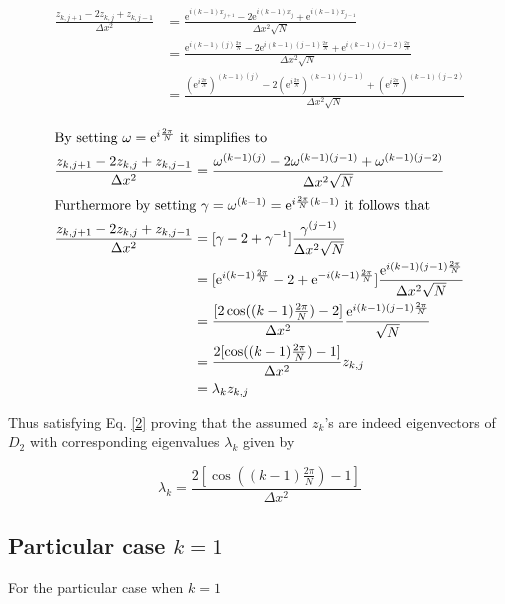\documentclass{article}
\newcommand{\E}{\mathrm{e}}
\begin{document}
\begin{equation*}
	\begin{split}
		\frac{z_{k,j+1} - 2 z_{k,j} + z_{k,j-1}}{\Delta x^2} 
		& = \frac{\E^{i (k-1) x_{j+1} } - 2 \E^{i (k-1) x_{j} } + \E^{i (k-1) x_{j-1} } }{ \Delta x^2 \sqrt{N} } \\
		& = \frac{\E^{i (k-1) (j) \frac{ 2\pi }{ N } } - 2 \E^{i (k-1) (j-1) \frac{ 2\pi }{ N } } + \E^{i (k-1) (j-2) \frac{ 2\pi }{ N } } }{ \Delta x^2 \sqrt{N} } \\
		& = \frac{ (\E^{i \frac{ 2\pi }{ N } })^{(k-1)(j)} - 2 (\E^{i \frac{ 2\pi }{ N } })^{(k-1)(j-1)} + (\E^{i \frac{ 2\pi }{ N } })^{(k-1)(j-2)} }{\Delta x^2 \sqrt{N}} \\
	\end{split}
\end{equation*}
\begin{equation*}
	\begin{split}
		\intertext{By setting $\omega = \E^{ i \frac{ 2\pi }{ N } }$ it simplifies to}	
		\frac{z_{k,j+1} - 2 z_{k,j} + z_{k,j-1}}{\Delta x^2} 	
		& = \frac{ \omega^{(k-1)(j)} - 2 \omega^{(k-1)(j-1)} + \omega^{(k-1)(j-2)} }{\Delta x^2 \sqrt{N}} \\
		\intertext{Furthermore by setting $\gamma = \omega^{(k-1)} = \E^{ i \frac{ 2\pi }{ N } (k-1) }$ it follows that}
		\frac{z_{k,j+1} - 2 z_{k,j} + z_{k,j-1}}{\Delta x^2} 
		& = [ \gamma - 2 + \gamma^{-1} ] \frac{ \gamma^{(j-1)} }{ \Delta x^2 \sqrt{N}} \\
		& = [ \E^{i (k-1) \frac{ 2\pi }{ N } } - 2 + \E^{-i (k-1) \frac{ 2\pi }{ N } } ] \frac{ \E^{i (k-1) (j-1) \frac{ 2\pi }{ N } } }{ \Delta x^2 \sqrt{N}} \\
		& = \frac{ [2 \cos( (k-1) \frac{2 \pi}{N} ) - 2]}{\Delta x^2} \frac{ \E^{i (k-1) (j-1) \frac{ 2\pi }{ N } } }{\sqrt{N} } \\
		& = \frac{2 [ \cos( (k-1) \frac{2 \pi}{N} ) - 1 ]}{\Delta x^2} z_{k,j} \\
		& = \lambda_k z_{k,j}
	\end{split}
\end{equation*}

Thus satisfying Eq. \eqref{2} proving that the assumed $z_k$'s are indeed eigenvectors of $D_2$ with corresponding eigenvalues $\lambda_k$ given by 

\[
	\lambda_k = \frac{2 [ \cos( (k-1) \frac{2 \pi}{N} ) - 1 ]}{\Delta x^2}
\]

\subsection{Particular case $k=1$}
For the particular case when $k=1$
\end{document}

